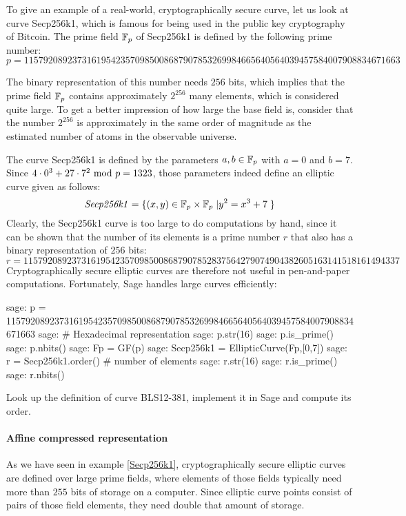 \begin{example}\label{Secp256k1}
To give an example of a real-world, cryptographically secure curve, let us look at curve Secp256k1, which is famous for being used in the public key cryptography of Bitcoin. The prime field $\mathbb{F}_p$ of Secp256k1 is defined by the following prime number:
$$
p = \scriptstyle 115792089237316195423570985008687907853269984665640564039457584007908834671663
$$
 
 The binary representation of this number needs $256$ bits, which implies that the prime field $\mathbb{F}_p$  contains approximately $2^{256}$ many elements, which is considered quite large. To get a better impression of how large the base field is, consider that the number $2^{256}$ is approximately in the same order of magnitude as the estimated number of atoms in the observable universe. 

The curve Secp256k1 is defined by the parameters $a,b\in \mathbb{F}_p$ with $a=0$ and $b=7$. Since $4\cdot 0^3 + 27\cdot 7^2 \text{ mod } p=1323$, those parameters indeed define an elliptic curve given as follows:
$$
\mathit{Secp256k1} = \{(x,y)\in \mathbb{F}_p\times \mathbb{F}_p\;| y^2 = x^3 +7\;\} 
$$
Clearly, the Secp256k1 curve is too large to do computations by hand, since it can be shown that  the number of its elements is a prime number $r$ that also has a binary representation of $256$ bits:
$$
r = \scriptstyle 11579208923731619542357098500868790785283756427907490438260516
3141518161494337
$$
Cryptographically secure elliptic curves are therefore not useful in pen-and-paper computations. Fortunately, Sage handles large curves efficiently:
\begin{sagecommandline}
sage: p = 115792089237316195423570985008687907853269984665640564039457584007908834671663
sage: # Hexadecimal representation
sage: p.str(16)
sage: p.is_prime()
sage: p.nbits()
sage: Fp = GF(p)
sage: Secp256k1 = EllipticCurve(Fp,[0,7])
sage: r = Secp256k1.order() # number of elements
sage: r.str(16)
sage: r.is_prime()
sage: r.nbits()
\end{sagecommandline}
\end{example}
\begin{exercise}
Look up the definition of curve BLS12-381, implement it in Sage and compute its order.
\end{exercise}

\paragraph{Affine compressed representation} As we have seen in example \ref{Secp256k1}, cryptographically secure elliptic curves are defined over large prime fields, where elements of those fields typically need more than $255$ bits of storage on a computer. Since elliptic curve points consist of pairs of those field elements, they need double that amount of storage.

